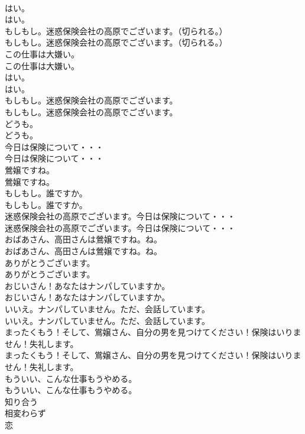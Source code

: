 \documentclass[8pt]{extreport}
\begin{document}
\begin{CJK}{UTF8}{min}
\\	はい。	
\\	はい。 
\\	もしもし。迷惑保険会社の高原でございます。（切られる。）	
\\	もしもし。迷惑保険会社の高原でございます。（切られる。） 
\\	この仕事は大嫌い。	
\\	この仕事は大嫌い。 
\\	はい。	
\\	はい。 
\\	もしもし。迷惑保険会社の高原でございます。	
\\	もしもし。迷惑保険会社の高原でございます。 
\\	どうも。	
\\	どうも。 
\\	今日は保険について・・・	
\\	今日は保険について・・・ 
\\	鶯嬢ですね。	
\\	鶯嬢ですね。 
\\	もしもし。誰ですか。	
\\	もしもし。誰ですか。 
\\	迷惑保険会社の高原でございます。今日は保険について・・・	
\\	迷惑保険会社の高原でございます。今日は保険について・・・ 
\\	おばあさん、高田さんは鶯嬢ですね。ね。	
\\	おばあさん、高田さんは鶯嬢ですね。ね。 
\\	ありがとうございます。	
\\	ありがとうございます。 
\\	おじいさん！あなたはナンパしていますか。	
\\	おじいさん！あなたはナンパしていますか。 
\\	いいえ。ナンパしていません。ただ、会話しています。	
\\	いいえ。ナンパしていません。ただ、会話しています。 
\\	まったくもう！そして、鴬嬢さん、自分の男を見つけてください！保険はいりません！失礼します。	
\\	まったくもう！そして、鴬嬢さん、自分の男を見つけてください！保険はいりません！失礼します。 
\\	もういい、こんな仕事もうやめる。	
\\	もういい、こんな仕事もうやめる。 
\\	知り合う
\\	相変わらず
\\	恋

\end{CJK}
\end{document}
